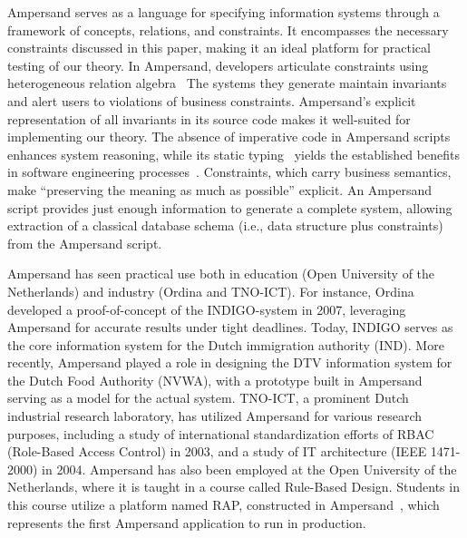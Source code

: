 \documentclass[runningheads]{llncs}
\begin{document}
   Ampersand serves as a language for specifying information systems through a framework of concepts, relations, and constraints.
   It encompasses the necessary constraints discussed in this paper, making it an ideal platform for practical testing of our theory.
   In Ampersand, developers articulate constraints using heterogeneous relation algebra~\cite{Hattensperger1999,Alloy2006}
   The systems they generate maintain invariants and alert users to violations of business constraints.
   Ampersand's explicit representation of all invariants in its source code makes it well-suited for implementing our theory.
   The absence of imperative code in Ampersand scripts enhances system reasoning,
   while its static typing~\cite{vdWoude2011} yields the established benefits in software engineering processes~\cite{HanenbergKRTS14,Petersen2014}.
   Constraints, which carry business semantics, make ``preserving the meaning as much as possible'' explicit.
   An Ampersand script provides just enough information to generate a complete system,
   allowing extraction of a classical database schema (i.e., data structure plus constraints) from the Ampersand script.

   Ampersand has seen practical use both in education (Open University of the Netherlands) and industry (Ordina and TNO-ICT).
   For instance, Ordina developed a proof-of-concept of the INDIGO-system in 2007,
   leveraging Ampersand for accurate results under tight deadlines.
   Today, INDIGO serves as the core information system for the Dutch immigration authority (IND).
   More recently, Ampersand played a role in designing the DTV information system for the Dutch Food Authority (NVWA),
   with a prototype built in Ampersand serving as a model for the actual system.
   TNO-ICT, a prominent Dutch industrial research laboratory, has utilized Ampersand for various research purposes,
   including a study of international standardization efforts of RBAC (Role-Based Access Control) in 2003,
   and a study of IT architecture (IEEE 1471-2000)\cite{IEEE1471} in 2004.
   Ampersand has also been employed at the Open University of the Netherlands,
   where it is taught in a course called Rule-Based Design\cite{RBD}.
   Students in this course utilize a platform named RAP, constructed in Ampersand~\cite{Michels2015},
   which represents the first Ampersand application to run in production.
\end{document}
